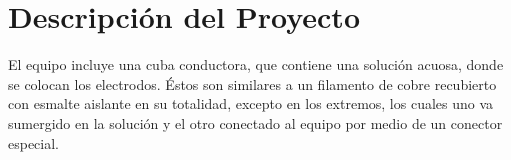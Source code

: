 \section{Descripción del Proyecto}
El equipo incluye una cuba conductora, que contiene una solución acuosa, donde se colocan los electrodos. Éstos son similares a un filamento de cobre recubierto con esmalte aislante en su totalidad, excepto en los extremos, los cuales uno va sumergido en la solución y el otro conectado al equipo por medio de un conector especial.\\

